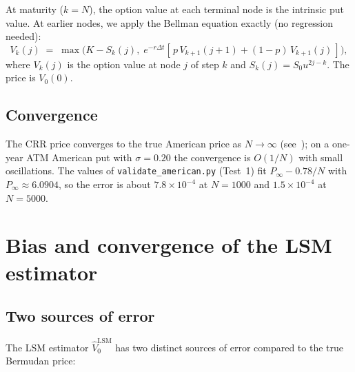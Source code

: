 \documentclass[11pt,a4paper]{article}
\theoremstyle{plain}
\theoremstyle{definition}
\theoremstyle{remark}
\begin{document}
At maturity ($k = N$), the option value at each terminal node is the
intrinsic put value. At earlier nodes, we apply the Bellman equation
exactly (no regression needed):
\begin{equation}
V_k(j) \;=\; \max\!\bigl( K - S_k(j),\; e^{-r \Delta t}
[\,p\, V_{k+1}(j + 1) + (1 - p)\, V_{k+1}(j)\,] \bigr),
\end{equation}
where $V_k(j)$ is the option value at node $j$ of step $k$ and
$S_k(j) = S_0 u^{2j - k}$. The price is $V_0(0)$.

\subsection{Convergence}

The CRR price converges to the true American price as $N \to \infty$
(see~\cite[Chapter 13]{Hull}); on a one-year ATM American put with
$\sigma = 0.20$ the convergence is $O(1/N)$ with small oscillations.
The values of \texttt{validate\_american.py} (Test~1) fit
$P_\infty - 0.78/N$ with $P_\infty \approx 6.0904$, so the error is
about $7.8 \times 10^{-4}$ at $N = 1000$ and $1.5 \times 10^{-4}$ at
$N = 5000$.

\section{Bias and convergence of the LSM estimator}
\label{sec:bias}

\subsection{Two sources of error}

The LSM estimator $\widehat V_0^{\mathrm{LSM}}$ has two distinct
sources of error compared to the true Bermudan price:
\end{document}
